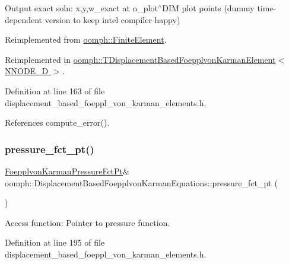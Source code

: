 Output exact soln\+: x,y,w\+\_\+exact at n\+\_\+plot$^\wedge$\+D\+IM plot points (dummy time-\/dependent version to keep intel compiler happy) 



Reimplemented from \hyperlink{classoomph_1_1FiniteElement_a2a8426dccd57b927be0ae0eec00d0479}{oomph\+::\+Finite\+Element}.



Reimplemented in \hyperlink{classoomph_1_1TDisplacementBasedFoepplvonKarmanElement_ade2f7fd74d6db0275a9e8bb255d7e495}{oomph\+::\+T\+Displacement\+Based\+Foepplvon\+Karman\+Element$<$ N\+N\+O\+D\+E\+\_\+D $>$}.



Definition at line 163 of file displacement\+\_\+based\+\_\+foeppl\+\_\+von\+\_\+karman\+\_\+elements.\+h.



References compute\+\_\+error().

\mbox{\label{classoomph_1_1DisplacementBasedFoepplvonKarmanEquations_a4a3f67d05cac2f289195c025a4c28d67}} 
\subsubsection{\texorpdfstring{pressure\+\_\+fct\+\_\+pt()}{pressure\_fct\_pt()}\hspace{0.1cm}{\footnotesize\ttfamily [1/2]}}
{\footnotesize\ttfamily \hyperlink{classoomph_1_1DisplacementBasedFoepplvonKarmanEquations_a9d63b92b57e3b521a5a10cecdafc4e65}{Foepplvon\+Karman\+Pressure\+Fct\+Pt}\& oomph\+::\+Displacement\+Based\+Foepplvon\+Karman\+Equations\+::pressure\+\_\+fct\+\_\+pt (\begin{DoxyParamCaption}{ }\end{DoxyParamCaption})\hspace{0.3cm}{\ttfamily [inline]}}



Access function\+: Pointer to pressure function. 



Definition at line 195 of file displacement\+\_\+based\+\_\+foeppl\+\_\+von\+\_\+karman\+\_\+elements.\+h.



